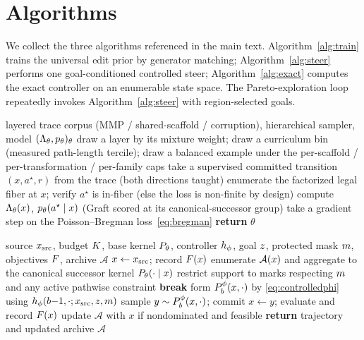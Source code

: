 \section{Algorithms}
\label{app:algorithms}

We collect the three algorithms referenced in the main text. Algorithm~\ref{alg:train} trains the
universal edit prior by generator matching; Algorithm~\ref{alg:steer} performs one goal-conditioned
controlled steer; Algorithm~\ref{alg:exact} computes the exact controller on an enumerable state space.
The Pareto-exploration loop repeatedly invokes Algorithm~\ref{alg:steer} with region-selected goals.

\begin{algorithm}[h]
\caption{Universal edit-prior training (generator matching)}
\label{alg:train}
\begin{algorithmic}[1]
\REQUIRE layered trace corpus (MMP / shared-scaffold / corruption), hierarchical sampler, model
$(\Lambda_\theta,p_\theta)_\theta$
  \STATE draw a layer by its mixture weight; draw a curriculum bin (measured path-length tercile); draw a
         balanced example under the per-scaffold / per-transformation / per-family caps
  \STATE take a supervised committed transition $(x,a^\star,r)$ from the trace (both directions taught)
  \STATE enumerate the factorized legal fiber at $x$; verify $a^\star$ is in-fiber (else the loss is
         non-finite by design)
  \STATE compute $\Lambda_\theta(x)$, $p_\theta(a^\star\mid x)$ (Graft scored at its canonical-successor group)
  \STATE take a gradient step on the Poisson--Bregman loss~\eqref{eq:bregman}
\ENDWHILE
\STATE \textbf{return} $\theta$
\end{algorithmic}
\end{algorithm}

\begin{algorithm}[h]
\caption{Goal-conditioned controlled editing (one steer)}
\label{alg:steer}
\begin{algorithmic}[1]
\REQUIRE source $x_{\mathrm{src}}$, budget $K$, base kernel $P_\theta$, controller $h_\phi$, goal
$z$, protected mask $m$, objectives $F$, archive $\mathcal{A}$
\STATE $x\gets x_{\mathrm{src}}$; record $F(x)$
  \STATE enumerate $\mathcal{A}(x)$ and aggregate to the canonical successor kernel $P_\theta(\cdot\mid x)$
  \STATE restrict support to marks respecting $m$ and any active pathwise constraint
   \STATE \textbf{break}  \ENDIF
  \STATE form $P^{\phi}_{b}(x,\cdot)$ by \eqref{eq:controlledphi} using
         $h_\phi(b{-}1,\cdot;x_{\mathrm{src}},z,m)$
  \STATE sample $y\sim P^{\phi}_{b}(x,\cdot)$; commit $x\gets y$; evaluate and record
         $F(x)$ 
  \STATE update $\mathcal{A}$ with $x$ if nondominated and feasible
\ENDFOR
\STATE \textbf{return} trajectory and updated archive $\mathcal{A}$
\end{algorithmic}
\end{algorithm}

